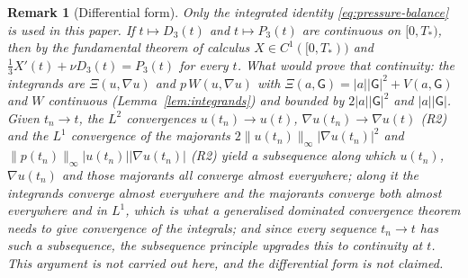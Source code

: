 \documentclass[11pt]{article}
\newtheorem{remark}[theorem]{Remark}
\theoremstyle{definition}
\theoremstyle{plain}
\newcommand{\norm}[1]{\lVert #1\rVert}
\begin{document}
\begin{remark}[Differential form]\label{rem:differential-form}
Only the integrated identity \eqref{eq:pressure-balance} is used in this
paper.  If $t\mapsto D_3(t)$ and $t\mapsto P_3(t)$ are continuous on
$[0,T_*)$, then by the fundamental theorem of calculus $X\in C^1([0,T_*))$
and $\frac13X'(t)+\nu D_3(t)=P_3(t)$ for every $t$.  What would prove that
continuity: the integrands are $\Xi(u,\nabla u)$ and $p\,W(u,\nabla u)$
with $\Xi(a,\mathsf G)=|a||\mathsf G|^2+V(a,\mathsf G)$ and $W$ continuous
(Lemma~\ref{lem:integrands}) and bounded by $2|a||\mathsf G|^2$ and
$|a||\mathsf G|$.  Given $t_n\to t$, the $L^2$ convergences
$u(t_n)\to u(t)$, $\nabla u(t_n)\to\nabla u(t)$ (R2) and the $L^1$
convergence of the majorants $2\norm{u(t_n)}_\infty|\nabla u(t_n)|^2$ and
$\norm{p(t_n)}_\infty|u(t_n)||\nabla u(t_n)|$ (R2) yield a subsequence along
which $u(t_n)$, $\nabla u(t_n)$ \emph{and} those majorants all converge
almost everywhere; along it the integrands converge almost everywhere and
the majorants converge both almost everywhere and in $L^1$, which is what a
generalised dominated convergence theorem needs to give convergence of the
integrals; and since every sequence $t_n\to t$ has such a subsequence, the
subsequence principle upgrades this to continuity at $t$.
This argument is not carried out here, and the differential form is not
claimed.
\end{remark}
\end{document}
